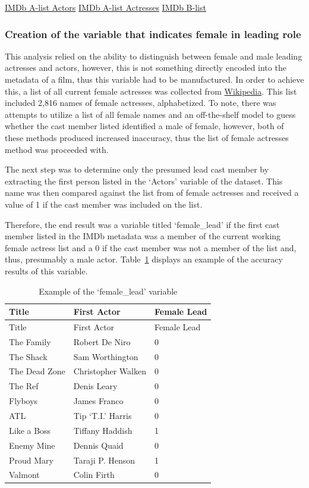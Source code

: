 \documentclass[
]{agujournal2019}
\begin{document}
\href{https://www.imdb.com/list/ls056262001/}{IMDb A-list Actors}
\href{https://www.imdb.com/list/ls056262192/}{IMDb A-list Actresses}
\href{https://www.imdb.com/list/ls024783564/}{IMDb B-list}

\subsubsection{Creation of the variable that indicates female in leading
role}\label{creation-of-the-variable-that-indicates-female-in-leading-role}

This analysis relied on the ability to distinguish between female and
male leading actresses and actors, however, this is not something
directly encoded into the metadata of a film, thus this variable had to
be manufactured. In order to achieve this, a list of all current female
actresses was collected from
\href{https://en.wikipedia.org/wiki/List_of_American_film_actresses}{Wikipedia}.
This list included 2,816 names of female actresses, alphabetized. To
note, there was attempts to utilize a list of all female names and an
off-the-shelf model to guess whether the cast member listed identified a
male of female, however, both of these methods produced increased
inaccuracy, thus the list of female actresses method was proceeded with.

The next step was to determine only the presumed lead cast member by
extracting the first person listed in the `Actors' variable of the
dataset. This name was then compared against the list from of female
actresses and received a value of 1 if the cast member was included on
the list.

Therefore, the end result was a variable titled `female\_lead' if the
first cast member listed in the IMDb metadata was a member of the
current working female actress list and a 0 if the cast member was not a
member of the list and, thus, presumably a male actor. Table~\ref{tbl-1}
displays an example of the accuracy results of this variable.

\begin{longtable}[]{@{}lll@{}}
\caption{Example of the `female\_lead'
variable}\label{tbl-1}\tabularnewline
\toprule\noalign{}
Title & First Actor & Female Lead \\
\midrule\noalign{}
\endfirsthead
\toprule\noalign{}
Title & First Actor & Female Lead \\
\midrule\noalign{}
\endhead
\bottomrule\noalign{}
\endlastfoot
The Family & Robert De Niro & 0 \\
The Shack & Sam Worthington & 0 \\
The Dead Zone & Christopher Walken & 0 \\
The Ref & Denis Leary & 0 \\
Flyboys & James Franco & 0 \\
ATL & Tip `T.I.' Harris & 0 \\
Like a Boss & Tiffany Haddish & 1 \\
Enemy Mine & Dennis Quaid & 0 \\
Proud Mary & Taraji P. Henson & 1 \\
Valmont & Colin Firth & 0 \\
\end{longtable}
\end{document}
